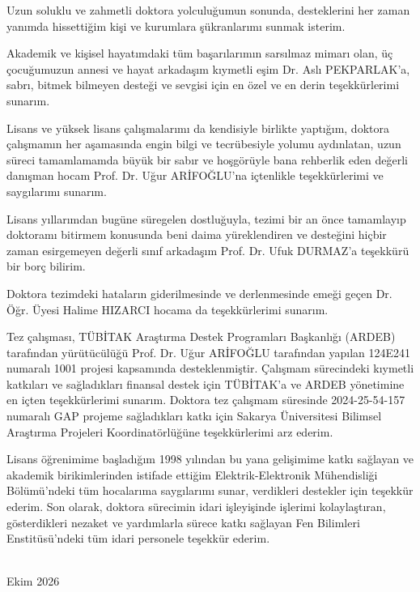 \begingroup
\singlespacing

Uzun soluklu ve zahmetli doktora yolculuğumun sonunda, desteklerini her zaman yanımda hissettiğim kişi ve kurumlara şükranlarımı sunmak isterim.

Akademik ve kişisel hayatımdaki tüm başarılarımın sarsılmaz mimarı olan, üç çocuğumuzun annesi ve hayat arkadaşım kıymetli eşim Dr. Aslı PEKPARLAK'a, sabrı, bitmek bilmeyen desteği ve sevgisi için en özel ve en derin teşekkürlerimi sunarım.

Lisans ve yüksek lisans çalışmalarımı da kendisiyle birlikte yaptığım, doktora çalışmamın her aşamasında engin bilgi ve tecrübesiyle yolumu aydınlatan, uzun süreci tamamlamamda büyük bir sabır ve hoşgörüyle bana rehberlik eden değerli danışman hocam Prof. Dr. Uğur ARİFOĞLU'na içtenlikle teşekkürlerimi ve saygılarımı sunarım.

Lisans yıllarımdan bugüne süregelen dostluğuyla, tezimi bir an önce tamamlayıp doktoramı bitirmem konusunda beni daima yüreklendiren ve desteğini hiçbir zaman esirgemeyen değerli sınıf arkadaşım Prof. Dr. Ufuk DURMAZ'a teşekkürü bir borç bilirim.

Doktora tezimdeki hataların giderilmesinde ve derlenmesinde emeği geçen Dr. Öğr. Üyesi Halime HIZARCI hocama da teşekkürlerimi sunarım.

Tez çalışması, TÜBİTAK Araştırma Destek Programları Başkanlığı (ARDEB) tarafından yürütücülüğü Prof. Dr. Uğur ARİFOĞLU tarafından yapılan 124E241 numaralı 1001 projesi kapsamında desteklenmiştir. Çalışmam sürecindeki kıymetli katkıları ve sağladıkları finansal destek için TÜBİTAK'a ve ARDEB yönetimine en içten teşekkürlerimi sunarım. Doktora tez çalışmam süresinde 2024-25-54-157 numaralı GAP projeme sağladıkları katkı için Sakarya Üniversitesi Bilimsel Araştırma Projeleri Koordinatörlüğüne teşekkürlerimi arz ederim.

Lisans öğrenimime başladığım 1998 yılından bu yana gelişimime katkı sağlayan ve akademik birikimlerinden istifade ettiğim Elektrik-Elektronik Mühendisliği Bölümü'ndeki tüm hocalarıma saygılarımı sunar, verdikleri destekler için teşekkür ederim. Son olarak, doktora sürecimin idari işleyişinde işlerimi kolaylaştıran, gösterdikleri nezaket ve yardımlarla sürece katkı sağlayan Fen Bilimleri Enstitüsü'ndeki tüm idari personele teşekkür ederim.

\vspace{8mm}
\begin{flushright}\TezYazari\\Ekim 2026\end{flushright}
\endgroup
